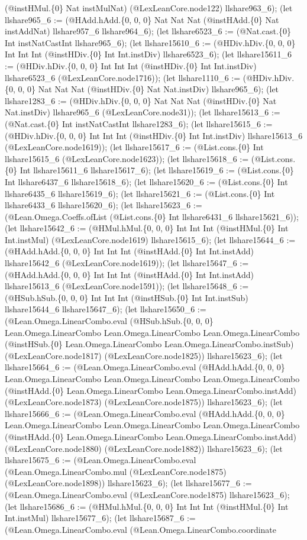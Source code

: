 \documentclass[11pt]{article}
\begin{document}
(@instHMul.\{0\} Nat instMulNat) (@LexLeanCore.node122) llshare963\_6); (let llshare965\_6 := (@HAdd.hAdd.\{0, 0, 0\} Nat Nat Nat (@instHAdd.\{0\} Nat instAddNat) llshare957\_6 llshare964\_6); (let llshare6523\_6 := (@Nat.cast.\{0\} Int instNatCastInt llshare965\_6); (let llshare15610\_6 := (@HDiv.hDiv.\{0, 0, 0\} Int Int Int (@instHDiv.\{0\} Int Int.instDiv) llshare6523\_6); (let llshare15611\_6 := (@HDiv.hDiv.\{0, 0, 0\} Int Int Int (@instHDiv.\{0\} Int Int.instDiv) llshare6523\_6 (@LexLeanCore.node1716)); (let llshare1110\_6 := (@HDiv.hDiv.\{0, 0, 0\} Nat Nat Nat (@instHDiv.\{0\} Nat Nat.instDiv) llshare965\_6); (let llshare1283\_6 := (@HDiv.hDiv.\{0, 0, 0\} Nat Nat Nat (@instHDiv.\{0\} Nat Nat.instDiv) llshare965\_6 (@LexLeanCore.node31)); (let llshare15613\_6 := (@Nat.cast.\{0\} Int instNatCastInt llshare1283\_6); (let llshare15615\_6 := (@HDiv.hDiv.\{0, 0, 0\} Int Int Int (@instHDiv.\{0\} Int Int.instDiv) llshare15613\_6 (@LexLeanCore.node1619)); (let llshare15617\_6 := (@List.cons.\{0\} Int llshare15615\_6 (@LexLeanCore.node1623)); (let llshare15618\_6 := (@List.cons.\{0\} Int llshare15611\_6 llshare15617\_6); (let llshare15619\_6 := (@List.cons.\{0\} Int llshare6437\_6 llshare15618\_6); (let llshare15620\_6 := (@List.cons.\{0\} Int llshare6435\_6 llshare15619\_6); (let llshare15621\_6 := (@List.cons.\{0\} Int llshare6433\_6 llshare15620\_6); (let llshare15623\_6 := (@Lean.Omega.Coeffs.ofList (@List.cons.\{0\} Int llshare6431\_6 llshare15621\_6)); (let llshare15642\_6 := (@HMul.hMul.\{0, 0, 0\} Int Int Int (@instHMul.\{0\} Int Int.instMul) (@LexLeanCore.node1619) llshare15615\_6); (let llshare15644\_6 := (@HAdd.hAdd.\{0, 0, 0\} Int Int Int (@instHAdd.\{0\} Int Int.instAdd) llshare15642\_6 (@LexLeanCore.node1619)); (let llshare15647\_6 := (@HAdd.hAdd.\{0, 0, 0\} Int Int Int (@instHAdd.\{0\} Int Int.instAdd) llshare15613\_6 (@LexLeanCore.node1591)); (let llshare15648\_6 := (@HSub.hSub.\{0, 0, 0\} Int Int Int (@instHSub.\{0\} Int Int.instSub) llshare15644\_6 llshare15647\_6); (let llshare15650\_6 := (@Lean.Omega.LinearCombo.eval (@HSub.hSub.\{0, 0, 0\} Lean.Omega.LinearCombo Lean.Omega.LinearCombo Lean.Omega.LinearCombo (@instHSub.\{0\} Lean.Omega.LinearCombo Lean.Omega.LinearCombo.instSub) (@LexLeanCore.node1817) (@LexLeanCore.node1825)) llshare15623\_6); (let llshare15664\_6 := (@Lean.Omega.LinearCombo.eval (@HAdd.hAdd.\{0, 0, 0\} Lean.Omega.LinearCombo Lean.Omega.LinearCombo Lean.Omega.LinearCombo (@instHAdd.\{0\} Lean.Omega.LinearCombo Lean.Omega.LinearCombo.instAdd) (@LexLeanCore.node1873) (@LexLeanCore.node1875)) llshare15623\_6); (let llshare15666\_6 := (@Lean.Omega.LinearCombo.eval (@HAdd.hAdd.\{0, 0, 0\} Lean.Omega.LinearCombo Lean.Omega.LinearCombo Lean.Omega.LinearCombo (@instHAdd.\{0\} Lean.Omega.LinearCombo Lean.Omega.LinearCombo.instAdd) (@LexLeanCore.node1880) (@LexLeanCore.node1882)) llshare15623\_6); (let llshare15675\_6 := (@Lean.Omega.LinearCombo.eval (@Lean.Omega.LinearCombo.mul (@LexLeanCore.node1875) (@LexLeanCore.node1898)) llshare15623\_6); (let llshare15677\_6 := (@Lean.Omega.LinearCombo.eval (@LexLeanCore.node1875) llshare15623\_6); (let llshare15686\_6 := (@HMul.hMul.\{0, 0, 0\} Int Int Int (@instHMul.\{0\} Int Int.instMul) llshare15677\_6); (let llshare15687\_6 := (@Lean.Omega.LinearCombo.eval (@Lean.Omega.LinearCombo.coordinate 
\end{document}
